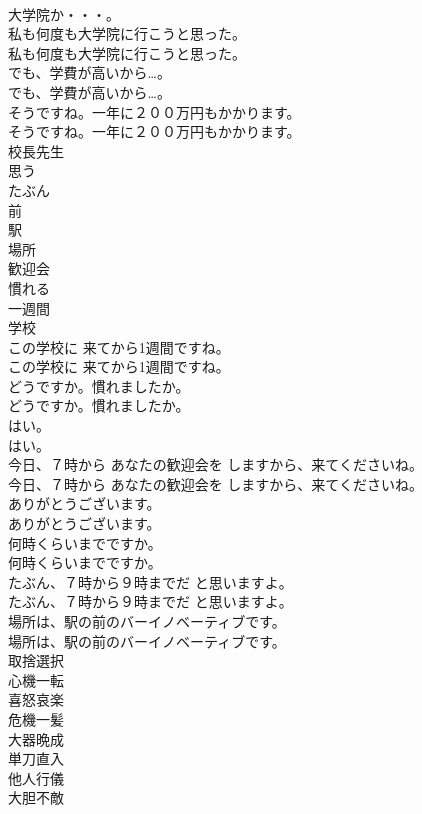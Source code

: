 \documentclass[8pt]{extreport}
\begin{document}
\begin{CJK}{UTF8}{min}
\\	大学院か・・・。 
\\	私も何度も大学院に行こうと思った。	
\\	私も何度も大学院に行こうと思った。 
\\	でも、学費が高いから…。	
\\	でも、学費が高いから…。 
\\	そうですね。一年に２００万円もかかります。	
\\	そうですね。一年に２００万円もかかります。 
\\	校長先生
\\	思う
\\	たぶん
\\	前
\\	駅
\\	場所
\\	歓迎会
\\	慣れる
\\	一週間
\\	学校
\\	この学校に 来てから1週間ですね。	
\\	この学校に 来てから1週間ですね。 
\\	どうですか。慣れましたか。	
\\	どうですか。慣れましたか。 
\\	はい。	
\\	はい。 
\\	今日、７時から あなたの歓迎会を しますから、来てくださいね。	
\\	今日、７時から あなたの歓迎会を しますから、来てくださいね。 
\\	ありがとうございます。	
\\	ありがとうございます。 
\\	何時くらいまでですか。	
\\	何時くらいまでですか。 
\\	たぶん、７時から９時までだ と思いますよ。	
\\	たぶん、７時から９時までだ と思いますよ。 
\\	場所は、駅の前のバーイノベーティブです。	
\\	場所は、駅の前のバーイノベーティブです。 
\\	取捨選択
\\	心機一転
\\	喜怒哀楽
\\	危機一髪
\\	大器晩成
\\	単刀直入
\\	他人行儀
\\	大胆不敵

\end{CJK}
\end{document}
